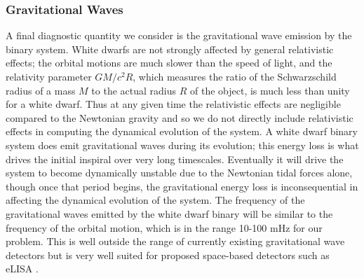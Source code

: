 \documentclass[iop]{../emulateapj}
\begin{document}
\subsubsection{Gravitational Waves}
\label{sec:grvatational_waves}

A final diagnostic quantity we consider is the gravitational wave emission by the 
binary system. White dwarfs are not strongly affected by general relativistic effects;
the orbital motions are much slower than the speed of light, and the relativity parameter 
$GM / c^2 R$, which measures the ratio of the Schwarzschild radius of a mass $M$ to the actual 
radius $R$ of the object, is much less than unity for a white dwarf. Thus at any given time the 
relativistic effects are negligible compared to the Newtonian gravity and so we do not 
directly include relativistic effects in computing the dynamical evolution of the system.
A white dwarf binary system does emit gravitational waves during its evolution; this energy loss 
is what drives the initial inspiral over very long timescales. Eventually it will drive the system 
to become dynamically unstable due to the Newtonian tidal forces alone, though once that period begins, 
the gravitational energy loss is inconsequential in affecting the dynamical evolution of the system. 
The frequency of the gravitational waves emitted by the white dwarf binary 
will be similar to the frequency of the orbital motion, which is in the range 
10-100 mHz for our problem. This is well outside the range of currently existing 
gravitational wave detectors but is very well suited for proposed space-based detectors such as eLISA \citep{eLISA}.
\end{document}
